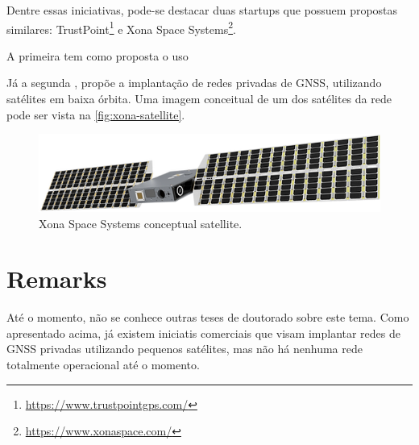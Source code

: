 Dentre essas iniciativas, pode-se destacar duas startups que possuem propostas similares: TrustPoint\footnote{\href{https://www.trustpointgps.com/}{https://www.trustpointgps.com/}} e Xona Space Systems\footnote{\href{https://www.xonaspace.com/}{https://www.xonaspace.com/}}.

A primeira tem como proposta o uso 

Já a segunda \cite{aarestad2020}, propõe a implantação de redes privadas de GNSS, utilizando satélites em baixa órbita. Uma imagem conceitual de um dos satélites da rede pode ser vista na \autoref{fig:xona-satellite}.

\begin{figure}[!ht]
    \begin{center}
        \includegraphics[width=0.8\columnwidth]{figures/xona-satellite}
        \caption{Xona Space Systems conceptual satellite.}
        \label{fig:xona-satellite}
    \end{center}
\end{figure}

\section{Remarks}

Até o momento, não se conhece outras teses de doutorado sobre este tema. Como apresentado acima, já existem iniciatis comerciais que visam implantar redes de GNSS privadas utilizando pequenos satélites, mas não há nenhuma rede totalmente operacional até o momento.
